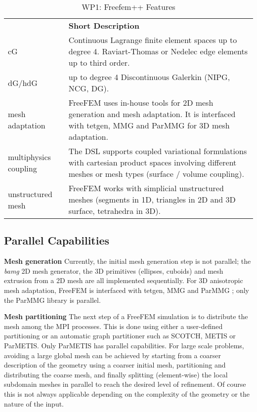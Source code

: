 \begin{table}[h!]
    \centering
    { 
        \setlength{\parindent}{0pt}
        \def\arraystretch{1.25}
        {
            \fontsize{9}{11}\selectfont
            \begin{tabular}{!{\color{numpexgray}\vrule}p{.25\linewidth}!{\color{numpexgray}\vrule}p{.6885\linewidth}!{\color{numpexgray}\vrule}}
    
     &  {\rule{0pt}{2.5ex}\color{white}\bf Short Description }\\ 
    
    cG & Continuous Lagrange finite element spaces up to degree 4. Raviart-Thomas or Nedelec edge elements up to third order. \\
    dG/hdG & up to degree 4 Discontinuous Galerkin (NIPG, NCG, DG).  \\
    mesh adaptation & FreeFEM uses in-house tools for 2D mesh generation and mesh adaptation. It is interfaced with tetgen, MMG and ParMMG for 3D mesh adaptation. \\
    multiphysics coupling & The DSL supports coupled variational formulations with cartesian product spaces involving different meshes or mesh types (surface / volume coupling). \\
 unstructured mesh & FreeFEM works with simplicial unstructured meshes (segments in 1D, triangles in 2D and 3D surface, tetrahedra in 3D). \\
\end{tabular}
        }
    }
    \caption{WP1: Freefem++ Features}
    \label{tab:WP1:Freefem++:features}
\end{table}


\subsection{Parallel Capabilities}
\label{sec:WP1:Freefem++:performances}

\textbf{Mesh generation} Currently, the initial mesh generation step is not parallel; the \textit{bamg} 2D mesh generator, the 3D primitives (ellipses, cuboids) and mesh extrusion from a 2D mesh are all implemented sequentially. For 3D anisotropic mesh adaptation, FreeFEM is interfaced with tetgen, MMG and ParMMG ; only the ParMMG library is parallel.

\textbf{Mesh partitioning} The next step of a FreeFEM simulation is to distribute the mesh among the MPI processes. This is done using either a user-defined partitioning or an automatic graph partitioner such as SCOTCH, METIS or ParMETIS. Only ParMETIS has parallel capabilities. For large scale problems, avoiding a large global mesh can be achieved by starting from a coarser description of the geometry using a coarser initial mesh, partitioning and distributing the coarse mesh, and finally splitting (element-wise) the local subdomain meshes in parallel to reach the desired level of refinement. Of course this is not always applicable depending on the complexity of the geometry or the nature of the input. 

